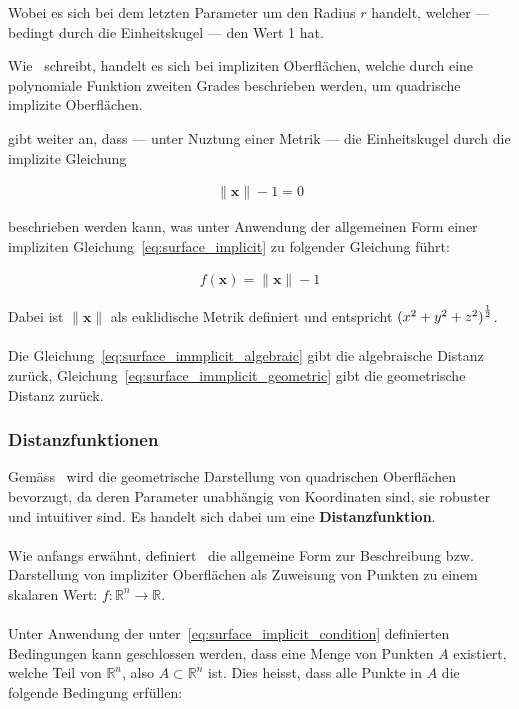 Wobei es sich bei dem letzten Parameter um den Radius $r$ handelt, welcher ---
bedingt durch die Einheitskugel --- den Wert 1 hat.

Wie~\cite{division_introduction_1996} schreibt, handelt es sich bei impliziten
Oberflächen, welche durch eine polynomiale Funktion zweiten Grades beschrieben
werden, um quadrische implizite Oberflächen.

\cite{hart_sphere_1994} gibt weiter an, dass --- unter Nuztung einer Metrik ---
die Einheitskugel durch die implizite Gleichung

\begin{gather} \label{eq:surface_immplicit_geometric}
    \|\bm{x}\| - 1 = 0
\end{gather}

beschrieben werden kann, was unter Anwendung der allgemeinen Form einer
impliziten Gleichung~\ref{eq:surface_implicit} zu folgender Gleichung
führt:

\begin{gather}\label{eq:surface_implicit_sphere}
    f(\bm{x}) = \|\bm{x}\| - 1
\end{gather}


Dabei ist $\|\bm{x}\|$ als euklidische Metrik definiert und entspricht ${(x^{2} + y^{2} + z^{2})}^{1 \over 2}$.\\
\\
Die Gleichung~\ref{eq:surface_immplicit_algebraic} gibt die algebraische
Distanz zurück, Gleichung~\ref{eq:surface_immplicit_geometric} gibt die
geometrische Distanz zurück.\\

\subsubsection{Distanzfunktionen}
\label{ssubsec:distance_functions}

Gemäss~\cite{hart_sphere_1994} wird die geometrische Darstellung von
quadrischen Oberflächen bevorzugt, da deren Parameter unabhängig von
Koordinaten sind, sie robuster und intuitiver sind. Es handelt sich dabei um
eine \textbf{Distanzfunktion}.\\
\\
Wie anfangs erwähnt, definiert~\cite{hart_sphere_1994} die allgemeine Form zur
Beschreibung bzw. Darstellung von impliziter Oberflächen als Zuweisung von
Punkten zu einem skalaren Wert: $ f : \mathbb{R}^{n} \to \mathbb{R} $.\\
\\
Unter Anwendung der unter~\ref{eq:surface_implicit_condition} definierten
Bedingungen kann geschlossen werden, dass eine Menge von Punkten $A$ existiert,
welche Teil von $\mathbb{R}^{n}$, also $A \subset \mathbb{R}^{n}$ ist. Dies heisst, dass alle Punkte in $A$ die folgende Bedingung erfüllen:

